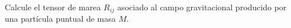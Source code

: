 
\question[1] 
Calcule el tensor de marea $R_{ij}$ asociado al campo gravitacional producido por una
partícula puntual de masa $M$.

\droptotalpoints
